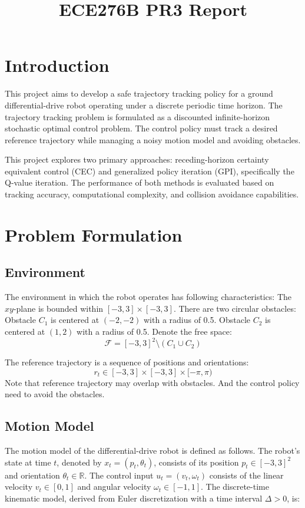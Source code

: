 \documentclass[conference]{IEEEtran}
\begin{document}
\title{ECE276B PR3 Report}

\author{
}

\maketitle

\section{Introduction}
This project aims to develop a safe trajectory tracking policy 
for a ground differential-drive robot operating 
under a discrete periodic time horizon.
The trajectory tracking problem is formulated as a 
discounted infinite-horizon stochastic optimal control problem.
The control policy must track a desired reference trajectory 
while managing a noisy motion model and avoiding obstacles. 

This project explores two primary approaches: 
receding-horizon certainty equivalent control (CEC) and 
generalized policy iteration (GPI), specifically the Q-value iteration. 
The performance of both methods is evaluated based on 
tracking accuracy, computational complexity, and collision avoidance capabilities.


\section{Problem Formulation}
\subsection{Environment}
The environment in which the robot operates has following characteristics:
The \(xy\)-plane is bounded within \([-3, 3] \times [-3, 3]\).
There are two circular obstacles:
Obstacle \( C_1 \) is centered at \((-2, -2)\) with a radius of 0.5.
Obstacle \( C_2 \) is centered at \((1, 2)\) with a radius of 0.5.
Denote the free space:
\[ \mathcal{F} = [-3, 3]^2 \setminus (C_1 \cup C_2) \]

The reference trajectory is a sequence of positions and orientations:
\[ r_t \in [-3,3] \times [-3,3] \times [-\pi, \pi)\]
Note that reference trajectory may overlap with obstacles.
And the control policy need to avoid the obstacles.

\subsection{Motion Model}
The motion model of the differential-drive robot is defined as follows. 
The robot's state at time \( t \), denoted by 
\( {x}_t = ({p}_t, \theta_t) \), 
consists of its position \( {p}_t \in [-3,3]^2 \) and orientation \( \theta_t \in \mathbb{R} \). 
The control input \( {u}_t = (v_t, \omega_t) \) 
consists of the linear velocity \( v_t \in [0,1] \) and 
angular velocity \( \omega_t \in [-1,1] \). 
The discrete-time kinematic model, 
derived from Euler discretization with a time interval \( \Delta > 0 \), is:
\end{document}
